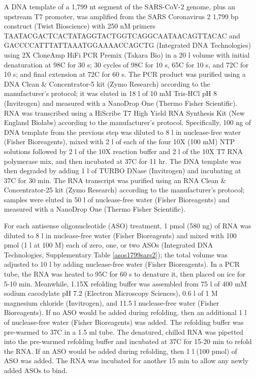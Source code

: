 \documentclass[main.tex]{subfiles}
\begin{document}
A DNA template of a 1,799 nt segment of the SARS-CoV-2 genome, plus an upstream T7 promoter, was amplified from the SARS Coronavirus 2 1,799 bp construct (Twist Bioscience) with 250 nM primers TAATACGACTCACTATAGGTACTGGTCAGGCAATAACAGTTACAC and GACCCCATTTATTAAATGGAAAACCAGCTG (Integrated DNA Technologies) using 2X CloneAmp HiFi PCR Premix (Takara Bio) in a 20 \textmu l volume with initial denaturation at 98\textdegree C for 30 s; 30 cycles of 98\textdegree C for 10 s, 65\textdegree C for 10 s, and 72\textdegree C for 10 s; and final extension at 72\textdegree C for 60 s.
The PCR product was purified using a DNA Clean \& Concentrator-5 kit (Zymo Research) according to the manufacturer's protocol; it was eluted in 18 \textmu l of 10 mM Tris-HCl pH 8 (Invitrogen) and measured with a NanoDrop One (Thermo Fisher Scientific).
RNA was transcribed using a HiScribe T7 High Yield RNA Synthesis Kit (New England Biolabs) according to the manufacturer's protocol.
Specifically, 100 ng of DNA template from the previous step was diluted to 8 \textmu l in nuclease-free water (Fisher Bioreagents), mixed with 2 \textmu l of each of the four 10X (100 mM) NTP solutions followed by 2 \textmu l of the 10X reaction buffer and 2 \textmu l of the 10X T7 RNA polymerase mix, and then incubated at 37\textdegree C for 11 hr.
The DNA template was then degraded by adding 1 \textmu l of TURBO DNase (Invitrogen) and incubating at 37\textdegree C for 30 min.
The RNA transcript was purified using an RNA Clean \& Concentrator-25 kit (Zymo Research) according to the manufacturer's protocol; samples were eluted in 50 \textmu l of nuclease-free water (Fisher Bioreagents) and measured with a NanoDrop One (Thermo Fisher Scientific).

For each antisense oligonucleotide (ASO) treatment, 1 pmol (580 ng) of RNA was diluted to 8 \textmu l in nuclease-free water (Fisher Bioreagents) and mixed with 100 pmol (1 \textmu l at 100 \textmu M) each of zero, one, or two ASOs (Integrated DNA Technologies, Supplementary Table \ref{asos1799sars2}); the total volume was adjusted to 10 \textmu l by adding nuclease-free water (Fisher Bioreagents).
In a PCR tube, the RNA was heated to 95\textdegree C for 60 s to denature it, then placed on ice for 5-10 min.
Meanwhile, 1.15X refolding buffer was assembled from 75 \textmu l of 400 mM sodium cacodylate pH 7.2 (Electron Microscopy Sciences), 0.6 \textmu l of 1 M magnesium chloride (Invitrogen), and 11.5 \textmu l nuclease-free water (Fisher Bioreagents).
If no ASO would be added during refolding, then an additional 1 \textmu l of nuclease-free water (Fisher Bioreagents) was added.
The refolding buffer was pre-warmed to 37\textdegree C in a 1.5 ml tube.
The denatured, chilled RNA was pipetted into the pre-warmed refolding buffer and incubated at 37\textdegree C for 15-20 min to refold the RNA.
If an ASO would be added during refolding, then 1 \textmu l (100 pmol) of ASO was added.
The RNA was incubated for another 15 min to allow any newly added ASOs to bind.
\end{document}
